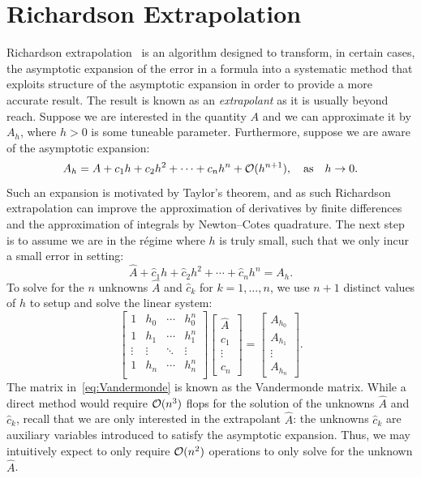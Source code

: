 \section{Richardson Extrapolation}

Richardson extrapolation~\cite{Richardson-210-459-11} is an algorithm designed to transform, in certain cases, the asymptotic expansion of the error in a formula into a systematic method that exploits structure of the asymptotic expansion in order to provide a more accurate result. The result is known as an {\em extrapolant} as it is usually beyond reach. Suppose we are interested in the quantity $A$ and we can approximate it by $A_h$, where $h>0$ is some tuneable parameter. Furthermore, suppose we are aware of the asymptotic expansion:
\[
A_h = A + c_1h + c_2h^2 + \cdots + c_nh^n + \mathcal{O}(h^{n+1}),\quad{\rm as}\quad h\to0.
\]
Such an expansion is motivated by Taylor's theorem, and as such Richardson extrapolation can improve the approximation of derivatives by finite differences and the approximation of integrals by Newton--Cotes quadrature. The next step is to assume we are in the r\'egime where $h$ is truly small, such that we only incur a small error in setting:
\begin{equation}\label{eq:RichardsonExtrapolation}
\hat{A} + \hat{c}_1h + \hat{c}_2h^2 + \cdots + \hat{c}_nh^n = A_h.
\end{equation}
To solve for the $n$ unknowns $\hat{A}$ and $\hat{c}_k$ for $k=1,\ldots,n$, we use $n+1$ distinct values of $h$ to setup and solve the linear system:
\begin{equation}\label{eq:Vandermonde}
\begin{bmatrix}
1 & h_0 & \cdots & h_0^n\\
1 & h_1 & \cdots & h_1^n\\
\vdots & \vdots & \ddots & \vdots\\
1 & h_n & \cdots & h_n^n\\
\end{bmatrix}
\begin{bmatrix} \hat{A}\\\hat{c}_1\\\vdots\\\hat{c}_n\end{bmatrix}
=
\begin{bmatrix} A_{h_0}\\A_{h_1}\\\vdots\\A_{h_n}\end{bmatrix}.
\end{equation}
The matrix in~\eqref{eq:Vandermonde} is known as the Vandermonde matrix. While a direct method would require $\mathcal{O}(n^3)$ flops for the solution of the unknowns $\hat{A}$ and $\hat{c}_k$, recall that we are only interested in the extrapolant $\hat{A}$: the unknowns $\hat{c}_k$ are auxiliary variables introduced to satisfy the asymptotic expansion. Thus, we may intuitively expect to only require $\mathcal{O}(n^2)$ operations to only solve for the unknown $\hat{A}$.

